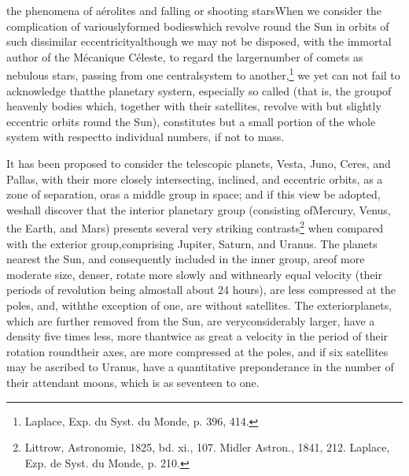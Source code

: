 the phenomena of a\'{e}rolites and falling or shooting starsWhen we consider the complication of variouslyformed bodieswhich revolve round the Sun in orbits of such dissimilar eccentricityalthough we may not be disposed, with the immortal author of the M\'{e}canique C\'{e}leste, to regard the largernumber of comets as nebulous stars, passing from one centralsystem to another,\footnote{Laplace, Exp. du Syst. du Monde, p. 396, 414.} we yet can not fail to acknowledge thatthe planetary systern, especially so called (that is, the groupof heavenly bodies which, together with their satellites, revolve with but slightly eccentric orbits round the Sun), constitutes but a small portion of the whole system with respectto individual numbers, if not to mass.

It has been proposed to consider the telescopic planets, Vesta, Juno, Ceres, and Pallas, with their more closely intersecting, inclined, and eccentric orbits, as a zone of separation, oras a middle group in space; and if this view be adopted, weshall discover that the interior planetary group (consisting ofMercury, Venus, the Earth, and Mars) presents several very striking contrasts\footnote{Littrow, Astronomie, 1825, bd. xi.,  107. Midler Astron., 1841, 212. Laplace, Ezp. de Syst. du Monde, p. 210. }
when compared with the exterior group,comprising Jupiter, Saturn, and Uranus. The planets nearest the Sun, and consequently included in the inner group, areof more moderate size, denser, rotate more slowly and withnearly equal velocity (their periods of revolution being almostall about 24 hours), are less compressed at the poles, and, withthe exception of one, are without satellites. The exteriorplanets, which are further removed from the Sun, are veryconsiderably larger, have a density five times less, more thantwice as great a velocity in the period of their rotation roundtheir axes, are more compressed at the poles, and if six satellites may be ascribed to Uranus, have a quantitative preponderance in the number of their attendant moons, which is as seventeen to one.


